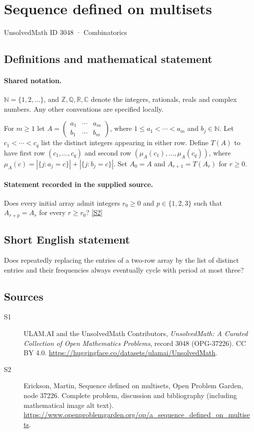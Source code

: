 \documentclass[11pt]{book}
\newcommand{\sref}[2]{\hyperlink{source:#1:#2}{[S#2]}}
\begin{document}
\setcounter{section}{3047}
\section{Sequence defined on multisets}\label{3048}
{\small\sffamily UnsolvedMath ID 3048 · Combinatorics}
\subsection{Definitions and mathematical statement}

\paragraph{Shared notation.}$\mathbb N=\{1,2,\ldots\}$, and $\mathbb Z,\mathbb Q,\mathbb R,\mathbb C$ denote the integers, rationals, reals and complex numbers. Any other conventions are specified locally.


For $m\geq1$ let $A=\begin{pmatrix}a_1&\cdots&a_m\\b_1&\cdots&b_m\end{pmatrix}$, where $1\leq a_1<\cdots<a_m$ and $b_j\in\mathbb N$. Let $c_1<\cdots<c_q$ list the distinct integers appearing in either row. Define $T(A)$ to have first row $(c_1,\ldots,c_q)$ and second row $(\mu_A(c_1),\ldots,\mu_A(c_q))$, where $\mu_A(c)=|\{j:a_j=c\}|+|\{j:b_j=c\}|$. Set $A_0=A$ and $A_{r+1}=T(A_r)$ for $r\geq0$.
\paragraph{Statement recorded in the supplied source.}
Does every initial array admit integers $r_0\geq0$ and $p\in\{1,2,3\}$ such that $A_{r+p}=A_r$ for every $r\geq r_0$? \sref{3048}{2}
\subsection{Short English statement}
Does repeatedly replacing the entries of a two-row array by the list of distinct entries and their frequencies always eventually cycle with period at most three?
\subsection{Sources}
\begin{description}
\item[\hypertarget{source:3048:1}{S1}] ULAM.AI and the UnsolvedMath Contributors, \emph{UnsolvedMath: A Curated Collection of Open Mathematics Problems}, record 3048 (OPG-37226). CC BY 4.0. \url{https://huggingface.co/datasets/ulamai/UnsolvedMath}.
\item[\hypertarget{source:3048:2}{S2}] Erickson, Martin, Sequence defined on multisets, Open Problem Garden, node 37226. Complete problem, discussion and bibliography (including mathematical image alt text). \url{https://www.openproblemgarden.org/op/a_sequence_defined_on_multisets}.
\end{description}
\label{end:3048}
\end{document}
